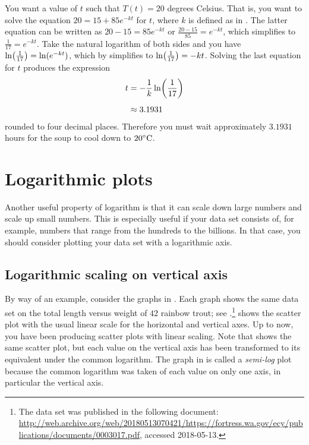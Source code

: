 \documentclass[a4paper,oneside,12pt]{article}
\begin{document}
{\begin{solution}
You want a value of $t$ such that $T(t) = 20$ degrees Celsius.  That
is, you want to solve the equation $20 = 15 + 85 e^{-kt}$ for $t$,
where $k$ is defined as in
.  The latter
equation can be written as $20 - 15 = 85 e^{-kt}$ or
$\frac{20 - 15}{85} = e^{-kt}$, which simplifies to
$\frac{1}{17} = e^{-kt}$.  Take the natural logarithm of both sides
and you have $\ln \parenthesis*{\frac{1}{17}} = \ln (e^{-kt})$, which
by
simplifies to $\ln \parenthesis*{\frac{1}{17}} = -kt$.  Solving the
last equation for $t$ produces the expression
\begin{align*}
t
&=
-\frac{1}{k} \ln \parenthesis*{\frac{1}{17}} \\[4pt]
&\approx
3.1931
\end{align*}
rounded to four decimal places.  Therefore you must wait approximately
$3.1931$ hours for the soup to cool down to ${20}^{\circ}\textrm{C}$.
\end{solution}
}{}



\section{Logarithmic plots}

Another useful property of logarithm is that it can scale down large
numbers and scale up small numbers.  This is especially useful if your
data set consists of, for example, numbers that range from the
hundreds to the billions.  In that case, you should consider plotting
your data set with a logarithmic axis.



\subsection{Logarithmic scaling on vertical axis}

By way of an example, consider the graphs in
.  Each graph shows the same data
set on the total length versus weight of $42$ rainbow trout; see
.\footnote{
  The data set was published in the following document:
  \url{http://web.archive.org/web/20180513070421/https://fortress.wa.gov/ecy/publications/documents/0003017.pdf},
  accessed 2018-05-13.
}
 shows the scatter plot
with the usual linear scale for the horizontal and vertical axes.  Up
to now, you have been producing scatter plots with linear scaling.
Note that  shows the same
scatter plot, but each value on the vertical axis has been transformed
to its equivalent under the common logarithm.  The graph in
 is called a \emph{semi-log}
plot because the common logarithm was taken of each value on only one
axis, in particular the vertical axis.
\end{document}
